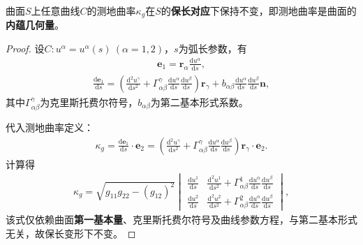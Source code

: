 \documentclass[../../main.tex]{subfiles}%
\begin{document}
\begin{theorem}
曲面$S$上任意曲线$C$的测地曲率$\kappa_g$在$S$的\textbf{保长对应}下保持不变，即测地曲率是曲面的\textbf{内蕴几何量}。
\end{theorem}
\begin{proof}
设$C:u^\alpha=u^\alpha(s)\ (\alpha=1,2)$，$s$为弧长参数，有
\begin{align*}
\boldsymbol{e}_1=\boldsymbol{r}_\alpha\frac{\mathrm{d}u^\alpha}{\mathrm{d}s},
\end{align*}
\begin{align}
\frac{\mathrm{d}\boldsymbol{e}_1}{\mathrm{d}s}=\left(\frac{\mathrm{d}^2u^\gamma}{\mathrm{d}s^2}+\Gamma_{\alpha\beta}^\gamma\frac{\mathrm{d}u^\alpha}{\mathrm{d}s}\frac{\mathrm{d}u^\beta}{\mathrm{d}s}\right)\boldsymbol{r}_\gamma+b_{\alpha\beta}\frac{\mathrm{d}u^\alpha}{\mathrm{d}s}\frac{\mathrm{d}u^\beta}{\mathrm{d}s}\boldsymbol{n},\label{eq:de1ds}
\end{align}
其中$\Gamma_{\alpha\beta}^\gamma$为克里斯托费尔符号，$b_{\alpha\beta}$为第二基本形式系数。

代入测地曲率定义：
\begin{align*}
\kappa_g=\frac{\mathrm{d}\boldsymbol{e}_1}{\mathrm{d}s}\cdot\boldsymbol{e}_2=\left(\frac{\mathrm{d}^2u^\gamma}{\mathrm{d}s^2}+\Gamma_{\alpha\beta}^\gamma\frac{\mathrm{d}u^\alpha}{\mathrm{d}s}\frac{\mathrm{d}u^\beta}{\mathrm{d}s}\right)\boldsymbol{r}_\gamma\cdot\boldsymbol{e}_2.
\end{align*}
计算得
\begin{align}
\kappa_g=\sqrt{g_{11}g_{22}-(g_{12})^2}
\begin{vmatrix}
\frac{\mathrm{d}u^1}{\mathrm{d}s}&\frac{\mathrm{d}^2u^1}{\mathrm{d}s^2}+\Gamma_{\alpha\beta}^1\frac{\mathrm{d}u^\alpha}{\mathrm{d}s}\frac{\mathrm{d}u^\beta}{\mathrm{d}s}\\
\frac{\mathrm{d}u^2}{\mathrm{d}s}&\frac{\mathrm{d}^2u^2}{\mathrm{d}s^2}+\Gamma_{\alpha\beta}^2\frac{\mathrm{d}u^\alpha}{\mathrm{d}s}\frac{\mathrm{d}u^\beta}{\mathrm{d}s}
\end{vmatrix},\label{eq:kgintrinsic}
\end{align}
该式仅依赖曲面\textbf{第一基本量}、克里斯托费尔符号及曲线参数方程，与第二基本形式无关，故保长变形下不变。
\end{proof}
\end{document}
